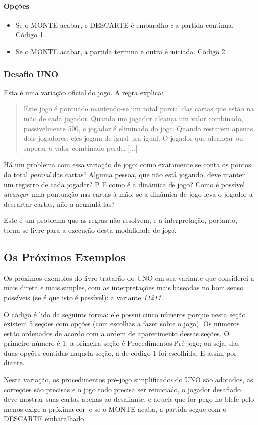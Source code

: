 \paragraph{Opções}

\begin{itemize}
\item{Se o MONTE acabar, o DESCARTE é embaralho e a partida continua. Código 1.}
\item{Se o MONTE acabar, a partida termina e outra é iniciada. Código 2.}
\end{itemize}

\subsubsection{Desafio UNO}

Esta é uma variação oficial do jogo. A regra explica:

\begin{quote}
Este jogo é pontuado mantendo-se um total parcial das cartas que estão na mão de cada jogador. Quando um jogador alcança um valor combinado, possivelmente 500, o jogador é eliminado do jogo. Quando restarem apenas dois jogadores, eles jogam de igual pra igual. O jogador que alcançar ou superar o valor combinado perde. [...]
\end{quote}

Há um problema com essa variação de jogo: como exatamente se conta os pontos do total \textit{parcial} das cartas? Alguma pessoa, que não está jogando, deve manter um registro de cada jogador?
P
E como é a dinâmica de jogo? Como é possível \textit{alcançar} uma pontuação nas cartas à mão, se a dinâmica de jogo leva o jogador a descartar cartas, não a acumulá-las?

Este é um problema que as regras não resolvem, e a interpretação, portanto, torna-se livre para a execução desta modalidade de jogo.

\subsection{Os Próximos Exemplos}

Os próximos exemplos do livro tratarão do UNO em sua variante que considerei a mais direta e mais simples, com as interpretações mais baseadas no bom senso possíveis (se é que isto é possível): a variante \emph{11211}.

O código é lido da seguinte forma: ele possui cinco números porque nesta seção existem 5 seções com opções (com escolhas a fazer sobre o jogo). Os números estão ordenados de acordo com a ordem de aparecimento dessas seções. O primeiro número é 1; a primeira seção é Procedimentos Pré-jogo; ou seja, das duas opções contidas naquela seção, a de código 1 foi escolhida. E assim por diante.

Nesta variação, os procedimentos pré-jogo simplificados do UNO são adotados, as correções são precisas e o jogo todo precisa ser reiniciado, o jogador desafiado deve mostrar suas cartas apenas ao desafiante, e aquele que for pego no blefe pelo menos exige a próxima cor, e se o MONTE acaba, a partida segue com o DESCARTE embaralhado.